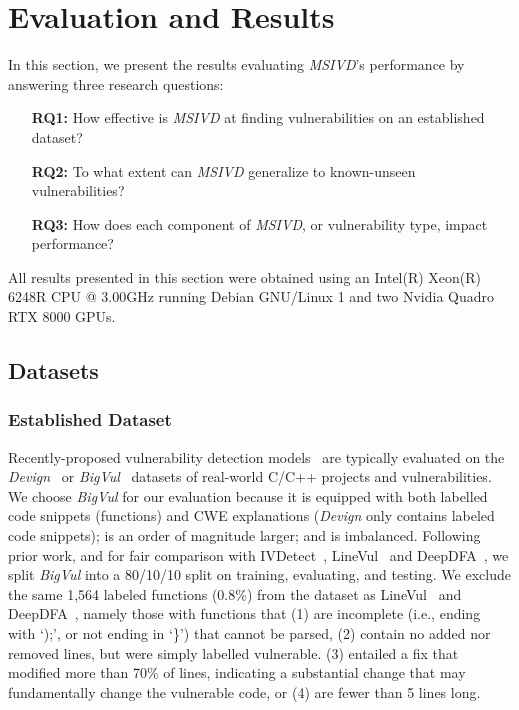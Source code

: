\documentclass[12pt,openany,oneside,table]{cmuthesis}
\begin{document}
\section{Evaluation and Results}

In this section, we present the results evaluating \textit{MSIVD}'s performance by answering three research questions:


\begin{enumerate}[leftmargin=3em]
    \itemsep0em 
    \item[\textbf{RQ1:}] How effective is \textit{MSIVD} at finding vulnerabilities on an established dataset?
    \item[\textbf{RQ2:}] To what extent can \textit{MSIVD} generalize to known-unseen vulnerabilities?
    \item[\textbf{RQ3:}] How does each component of \textit{MSIVD}, or vulnerability type, impact performance?
\end{enumerate}
All results presented in this section were obtained using an Intel(R) Xeon(R) 6248R CPU @ 3.00GHz running Debian GNU/Linux 1 and two Nvidia Quadro RTX 8000 GPUs.

\subsection{Datasets}

\subsubsection{Established Dataset}
Recently-proposed vulnerability detection models~\cite{deepdfa, ivdetect, linevd, linevul} are typically evaluated on the \textit{Devign}~\cite{zhou2019devign} or \textit{BigVul}~\cite{bigvul} datasets of real-world C/C++ projects and vulnerabilities. We choose \textit{BigVul} for our evaluation because it is equipped with both labelled code snippets (functions) and CWE explanations (\textit{Devign} only contains labeled code snippets); is an order of magnitude larger; and is imbalanced. 
Following prior work, and for fair comparison with IVDetect~\cite{ivdetect}, LineVul~\cite{linevul} and DeepDFA~\cite{deepdfa}, we split \textit{BigVul} into a 80/10/10 split on training, evaluating, and testing. We exclude the same 1,564 labeled functions (0.8\%)  from the dataset as 
LineVul~\cite{linevul} and DeepDFA~\cite{deepdfa}, namely those with functions that
(1) are incomplete (i.e., ending with ‘);’, or not ending in
‘\}’) that cannot be parsed,
(2) contain no added nor removed lines, but were simply labelled vulnerable. (3) entailed a fix that modified more than 70\% of lines,  indicating a substantial change that may fundamentally change the vulnerable code, or 
(4) are fewer than 5 lines long.
\end{document}
